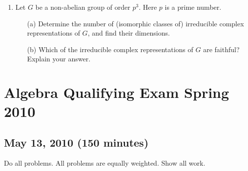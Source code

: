 \documentclass{article}
\begin{document}
\begin{enumerate}
    \item Let \(G\) be a non-abelian group of order \(p^3\). Here \(p\) is a prime number.
    \begin{itemize}
        \item[(a)] Determine the number of (isomorphic classes of) irreducible complex representations of \(G\), and find their dimensions.
        \item[(b)] Which of the irreducible complex representations of \(G\) are faithful? Explain your answer.
    \end{itemize}
\end{enumerate}

\section*{Algebra Qualifying Exam Spring 2010}
\subsection*{May 13, 2010 (150 minutes)}

Do all problems. All problems are equally weighted. Show all work.
\end{document}
